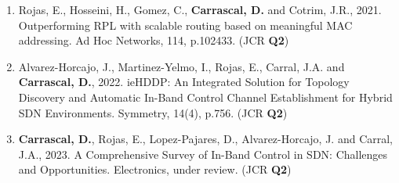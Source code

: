 \begin{enumerate}
    \item Rojas, E., Hosseini, H., Gomez, C., \textbf{Carrascal, D.} and Cotrim, J.R., 2021. Outperforming RPL with scalable routing based on meaningful MAC addressing. Ad Hoc Networks, 114, p.102433. (JCR \textbf{Q2})
    \item Alvarez-Horcajo, J., Martinez-Yelmo, I., Rojas, E., Carral, J.A. and \textbf{Carrascal, D.}, 2022. ieHDDP: An Integrated Solution for Topology Discovery and Automatic In-Band Control Channel Establishment for Hybrid SDN Environments. Symmetry, 14(4), p.756. (JCR \textbf{Q2})
    \item \textbf{Carrascal, D.}, Rojas, E., Lopez-Pajares, D., Alvarez-Horcajo, J. and Carral, J.A., 2023. A Comprehensive Survey of In-Band Control in SDN:
          Challenges and Opportunities. Electronics, under review. (JCR \textbf{Q2})
\end{enumerate}





